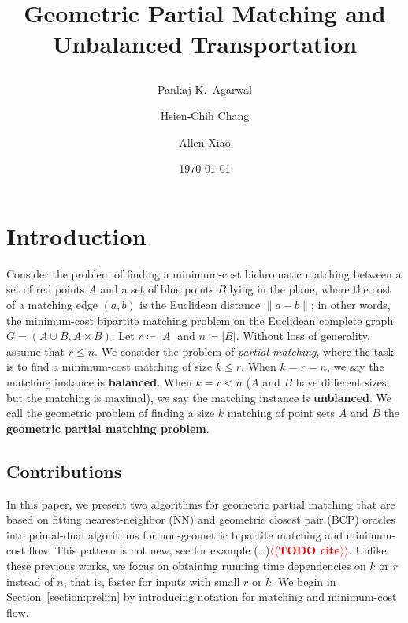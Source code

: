 \documentclass[11pt]{article}
\title{ Geometric Partial Matching and Unbalanced Transportation %
\date{\today} %
\author{
Pankaj K.\ Agarwal
\and
Hsien-Chih Chang
\and
Allen Xiao
}
}
\makeatletter
\theoremstyle{plain}
\numberwithin{figure}{section}
\def\EMPH#1{\textbf{\boldmath #1}}
\def\n@te#1{\textsf{\boldmath \textbf{$\langle\!\langle$#1$\rangle\!\rangle$}}\leavevmode}
\def\note#1{\textcolor{red}{\n@te{#1}}}
\makeatother
\begin{document}
\maketitle

\section{Introduction}

Consider the problem of finding a minimum-cost bichromatic matching between
a set of red points $A$ and a set of blue points $B$ lying in the plane,
where the cost of a matching edge $(a, b)$ is the Euclidean distance
$\|a - b\|$;
in other words, the minimum-cost bipartite matching problem on the Euclidean
complete graph $G = (A \cup B, A \times B)$.
Let $r \coloneqq |A|$ and $n \coloneqq |B|$.
Without loss of generality, assume that $r \leq n$.
We consider the problem of \emph{partial matching}, where the task is to
find a minimum-cost matching of size $k \leq r$.
When $k = r = n$, we say the matching instance is \EMPH{balanced}.
When $k = r < n$ ($A$ and $B$ have different sizes, but the matching is
maximal), we say the matching instance is \EMPH{unblanced}.
We call the geometric problem of finding a size $k$ matching of point sets $A$
and $B$ the \EMPH{geometric partial matching problem}.



\subsection{Contributions}

In this paper, we present two algorithms for geometric partial matching
that are based on fitting nearest-neighbor (NN) and geometric closest pair
(BCP) oracles into primal-dual algorithms for non-geometric bipartite matching
and minimum-cost flow.
This pattern is not new, see for example
(\dots)\note{TODO cite}.
Unlike these previous works, we focus on obtaining running time dependencies on
$k$ or $r$ instead of $n$, that is, faster for inputs with small $r$ or $k$.
We begin in Section~\ref{section:prelim} by introducing notation for matching
and minimum-cost flow.
\end{document}
